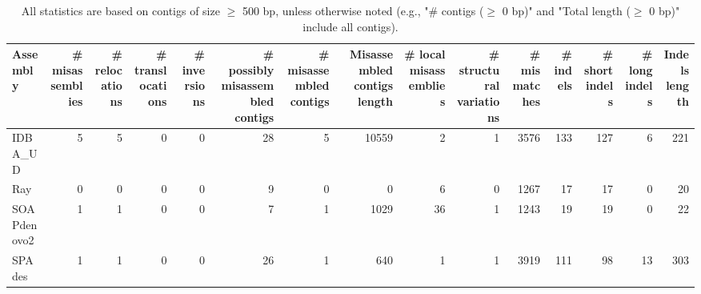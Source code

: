 \documentclass[12pt,a4paper]{article}
\begin{document}
\begin{table}[ht]
\begin{center}
\caption{All statistics are based on contigs of size $\geq$ 500 bp, unless otherwise noted (e.g., "\# contigs ($\geq$ 0 bp)" and "Total length ($\geq$ 0 bp)" include all contigs).}
\begin{tabular}{|l*{14}{|r}|}
\hline
Assembly & \# misassemblies &     \# relocations &     \# translocations &     \# inversions & \# possibly misassembled contigs & \# misassembled contigs & Misassembled contigs length & \# local misassemblies & \# structural variations & \# mismatches & \# indels &     \# short indels &     \# long indels & Indels length \\ \hline
IDBA\_UD & 5 & 5 & 0 & 0 & 28 & 5 & 10559 & 2 & 1 & 3576 & 133 & 127 & 6 & 221 \\ \hline
Ray & 0 & 0 & 0 & 0 & 9 & 0 & 0 & 6 & 0 & 1267 & 17 & 17 & 0 & 20 \\ \hline
SOAPdenovo2 & 1 & 1 & 0 & 0 & 7 & 1 & 1029 & 36 & 1 & 1243 & 19 & 19 & 0 & 22 \\ \hline
SPAdes & 1 & 1 & 0 & 0 & 26 & 1 & 640 & 1 & 1 & 3919 & 111 & 98 & 13 & 303 \\ \hline
\end{tabular}
\end{center}
\end{table}
\end{document}
